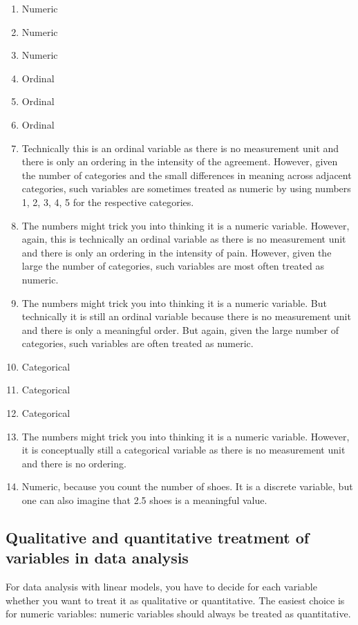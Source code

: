 \begin{enumerate}
\item Numeric
\item Numeric
\item Numeric
\item Ordinal
\item Ordinal
\item Ordinal
\item Technically this is an ordinal variable as there is no measurement unit and there is only an ordering in the intensity of the agreement. However, given the number of categories and the small differences in meaning across adjacent categories, such variables are sometimes treated as numeric by using numbers 1, 2, 3, 4, 5 for the respective categories.
\item The numbers might trick you into thinking it is a numeric variable. However, again, this is technically an ordinal variable as there is no measurement unit and there is only an ordering in the intensity of pain. However, given the large the number of categories, such variables are most often treated as numeric.
\item The numbers might trick you into thinking it is a numeric variable. But technically it is still an ordinal variable because there is no measurement unit and there is only a meaningful order. But again, given the large number of categories, such variables are often treated as numeric.
\item Categorical
\item Categorical
\item Categorical
\item The numbers might trick you into thinking it is a numeric variable. However, it is conceptually still a categorical variable as there is no measurement unit and there is no ordering. 
\item Numeric, because you count the number of shoes. It is a discrete variable, but one can also imagine that 2.5 shoes is a meaningful value.
\end{enumerate}



\subsection{Qualitative and quantitative treatment of variables in data analysis}
For data analysis with linear models, you have to decide for each variable whether you want to treat it as qualitative or quantitative. The easiest choice is for numeric variables: numeric variables should always be treated as quantitative. 

